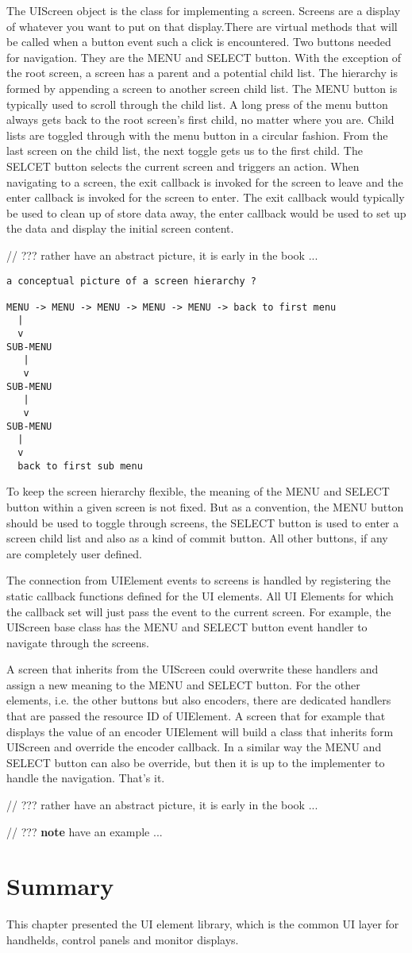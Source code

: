 The UIScreen object is the class for implementing a screen. Screens are a display of whatever you want to put on that display.There are virtual methods that will be called when a button event such a click is encountered. Two buttons needed for navigation. They are the MENU and SELECT button. With the exception of the root screen, a screen has a parent and a potential child list. The hierarchy is formed by appending a screen to another screen child list. The MENU button is typically used to scroll through the child list. A long press of the menu button always gets back to the root screen's first child, no matter where you are. Child lists are toggled through with the menu button in a circular fashion. From the last screen on the child list, the next toggle gets us to the first child. The SELCET button selects the current screen and triggers an action. When navigating to a screen, the exit callback is invoked for the screen to leave and the enter callback is invoked for the screen to enter. The exit callback would typically be used to clean up of store data away, the enter callback would be used to set up the data and display the initial screen content.

// ??? rather have an abstract picture, it is early in the book ...


\lstset{language=c++, style=codesnippetstyle}
\begin{lstlisting}
a conceptual picture of a screen hierarchy ?

MENU -> MENU -> MENU -> MENU -> MENU -> back to first menu
  |
  v
SUB-MENU
   |
   v
SUB-MENU
   |
   v
SUB-MENU
  |
  v
  back to first sub menu
\end{lstlisting}
\FloatBarrier

To keep the screen hierarchy flexible, the meaning of the MENU and SELECT button within a given screen is not fixed. But as a convention, the MENU button should be used to toggle through screens, the SELECT button is used to enter a screen child list and also as a kind of commit button. All other buttons, if any are completely user defined.

The connection from UIElement events to screens is handled by registering the static callback functions defined for the UI elements. All UI Elements for which the callback set will just pass the event to the current screen. For example, the UIScreen base class has the MENU and SELECT button event handler to navigate through the screens.

A screen that inherits from the UIScreen could overwrite these handlers and assign a new meaning to the MENU and SELECT button. For the other elements, i.e. the other buttons but also encoders, there are dedicated handlers that are passed the resource ID of UIElement. A screen that for example that displays the value of an encoder UIElement will build a class that inherits form UIScreen and override the encoder callback. In a similar way the MENU and SELECT button can also be override, but then it is up to the implementer to handle the navigation. That's it.

// ??? rather have an abstract picture, it is early in the book ...

// ??? \textbf{note} have an example ...

\section{Summary}

This chapter presented the UI element library, which is the common UI layer for handhelds, control panels and monitor displays.
